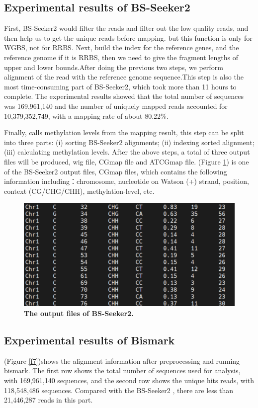 \documentclass{PHlab-thesis}
\begin{document}
\subsection{Experimental results of BS-Seeker2}
First, BS-Seeker2 would filter the reads and filter out the low quality reads, and then help us to get the unique reads before mapping. but this function is only for WGBS, not for RRBS. Next, build the index for the reference genes, and the reference genome if it is RRBS, then we need to give the fragment lengths of upper and lower bounds.After doing the previous two steps, we perform alignment of the read with the reference genome sequence.This step is also the most time-consuming part of BS-Seeker2, which took more than 11 hours to complete. The experimental results showed that the total number of sequences was 169,961,140 and the number of uniquely mapped reads accounted for 10,379,352,749, with a mapping rate of about 80.22\%.

\par
Finally, calls methylation levels from the mapping result, this step can be split into three parts: (i) sorting BS-Seeker2 alignments; (ii) indexing sorted alignment; (iii) calculating methylation levels. After the above steps, a total of three output files will be produced, wig file, CGmap file and ATCGmap file. (Figure \ref{f6}) is one of the BS-Seeker2 output files, CGmap files, which contains the following information including：chromosome, nucleotide on Watson (+) strand, position, context (CG/CHG/CHH), methylation-level, etc.

\begin{figure}[h]
  \centering
  \includegraphics[scale=0.8]{table/CGmap.png}
  \caption{\textbf{The output files of BS-Seeker2.}
  }
  \label{f6}
\end{figure}


\subsection{Experimental results of Bismark}
(Figure \ref{f7})shows the alignment information after preprocessing and running bismark. The first row shows the total number of sequences used for analysis, with 169,961,140 sequences, and the second row shows the unique hits reads, with 118,548,486 sequences. Compared with the BS-Seeker2 , there are less than 21,446,287 reads in this part.
\end{document}
